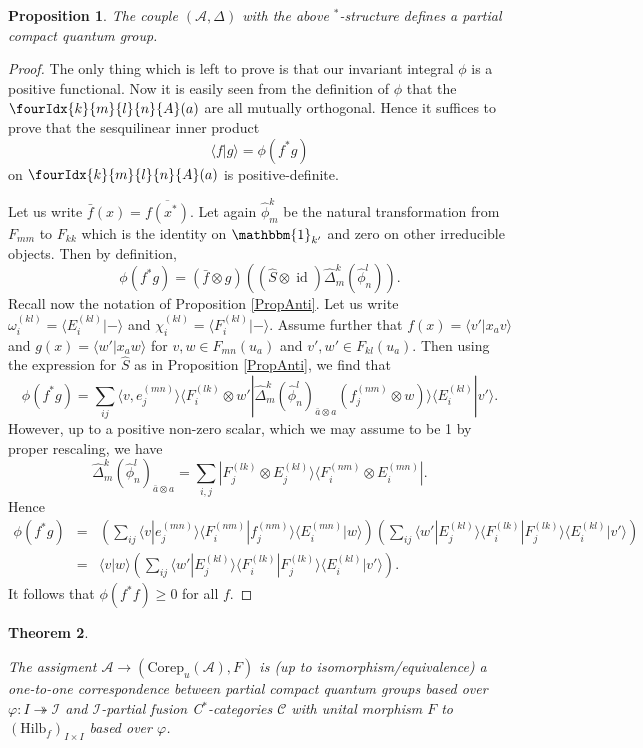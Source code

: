\documentclass[11pt]{article}
\DeclareMathOperator{\id}{id}
\newcommand{\Corep}{\mathrm{Corep}}
\newcommand{\CatCC}{\mathscr{C}}
\newcommand{\Hilb}{\mathrm{Hilb}}
\newcommand{\Unitb}{\mathbbm{1}}
\newcommand{\Gr}[5]{\fourIdx{#2}{#4}{#3}{#5}{#1}}%
\newtheorem{Theorem}{Theorem}[section]
\newtheorem{Prop}[Theorem]{Proposition}
\theoremstyle{definition}
\numberwithin{equation}{section}
\begin{document}
\begin{Prop} The couple $(\mathscr{A},\Delta)$ with the above $^*$-structure defines a partial compact quantum group.
\end{Prop}
\begin{proof} The only thing which is left to prove is that our invariant integral $\phi$ is a positive functional. Now it is easily seen from the definition of $\phi$ that the $\Gr{A}{k}{l}{m}{n}(a)$ are all mutually orthogonal. Hence it suffices to prove that the sesquilinear inner product \[\langle f| g\rangle = \phi(f^*g)\] on $\Gr{A}{k}{l}{m}{n}(a)$ is positive-definite. 

Let us write $\bar{f}(x) = \overline{f(x^*)}$. Let again $\hat{\phi}^k_m$ be the natural transformation from $F_{mm}$ to $F_{kk}$ which is the identity on $\Unitb_{k'}$ and zero on other irreducible objects. Then by definition, \[\phi(f^*g) = (\bar{f}\otimes g)((\hat{S}\otimes \id)\hat{\Delta}^k_m(\hat{\phi}^l_n)).\] Recall now the notation of Proposition \ref{PropAnti}. Let us write $\omega_i^{(kl)} = \langle E_i^{(kl)}| -\rangle$ and $\chi_i^{(kl)} = \langle F_i^{(kl)}| -\rangle$. Assume further that $f(x) = \langle v'| x_a v\rangle$ and $g(x) = \langle w' | x_aw\rangle$ for $v,w\in F_{mn}(u_a)$ and $v',w'\in F_{kl}(u_a)$. Then using the expression for $\hat{S}$ as in Proposition \ref{PropAnti}, we find that \[\phi(f^*g) = \sum_{ij} \langle v,e_j^{(mn)}\rangle\langle F_i^{(lk)}\otimes w' | \hat{\Delta}_m^k(\hat{\phi}^{l}_n)_{\bar{a}\otimes a} (f_j^{(nm)}\otimes w)\rangle \langle E_i^{(kl)}| v'\rangle .\] However, up to a positive non-zero scalar, which we may assume to be 1 by proper rescaling, we have \[\hat{\Delta}^k_m(\hat{\phi}^l_n)_{\bar{a}\otimes a} = \sum_{i,j} | F_j^{(lk)} \otimes E_j^{(kl)}\rangle \langle F_i^{(nm)}\otimes E_i^{(mn)}|.\] Hence \begin{eqnarray*} \phi(f^*g) &=&\left(\sum_{ij}\langle v| e_j^{(mn)}\rangle \langle F_i^{(nm)}| f_j^{(nm)}\rangle\langle E_i^{(mn)}| w\rangle \right)  \left(\sum_{ij}  \langle w' | E_j^{(kl)}\rangle \langle F_i^{(lk)}| F_j^{(lk)}\rangle\langle E_i^{(kl)}| v'\rangle\right)\\ &=& \langle v| w\rangle  \left(\sum_{ij}  \langle w'| E_j^{(kl)}\rangle \langle F_i^{(lk)}| F_j^{(lk)}\rangle\langle E_i^{(kl)}| v'\rangle\right).
\end{eqnarray*} It follows that $\phi(f^*f)\geq 0$ for all $f$.

\end{proof} 

\begin{Theorem} \label{TheoTKPCQG}

The assigment $\mathscr{A}\rightarrow (\Corep_u(\mathscr{A}),F)$ is (up to isomorphism/equivalence) a one-to-one correspondence between partial compact quantum groups based over $\varphi:I\twoheadrightarrow \mathscr{I}$ and $\mathscr{I}$-partial fusion C$^*$-categories $\CatCC$ with unital morphism $F$ to $(\Hilb_f)_{I\times I}$ based over $\varphi$. 
\end{Theorem} 
\end{document}
